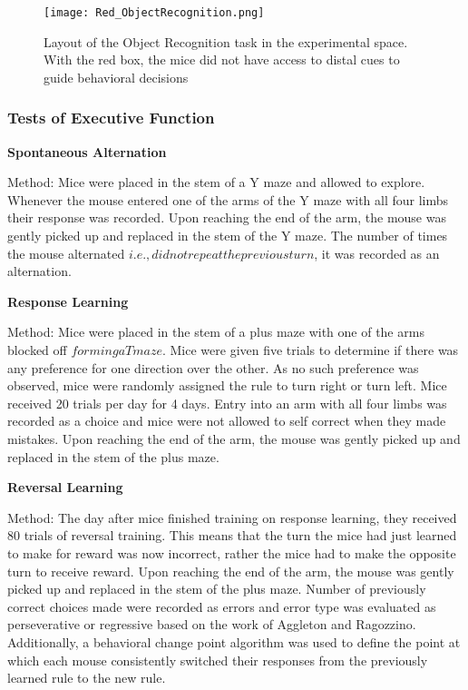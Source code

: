\documentclass{article}
\begin{document}
\begin{figure}[h!]
\centering
\texttt{[image: Red\_ObjectRecognition.png]}
\caption{Layout of the Object Recognition task in the experimental space. With the red box, the mice did not have access to distal cues to guide behavioral decisions}
\label{fig:Ambiguity Control}
\end{figure}

\subsubsection{Tests of Executive Function}
\textbf{Spontaneous Alternation}

Method:
Mice were placed in the stem of a Y maze and allowed to explore. Whenever the mouse entered one of the arms of the Y maze with all four limbs their response was recorded. Upon reaching the end of the arm, the mouse was gently picked up and replaced in the stem of the Y maze. The number of times the mouse alternated \(i.e., did not repeat the previous turn\), it was recorded as an alternation.

\textbf{Response Learning}

Method:
Mice were placed in the stem of a plus maze with one of the arms blocked off \(forming a T maze\). Mice were given five trials to determine if there was any preference for one direction over the other. As no such preference was observed, mice were randomly assigned the rule to turn right or turn left. Mice received 20 trials per day for 4 days. Entry into an arm with all four limbs was recorded as a choice and mice were not allowed to self correct when they made mistakes. Upon reaching the end of the arm, the mouse was gently picked up and replaced in the stem of the plus maze.

\textbf{Reversal Learning}

Method:
The day after mice finished training on response learning, they received 80 trials of reversal training. This means that the turn the mice had just learned to make for reward was now incorrect, rather the mice had to make the opposite turn to receive reward. Upon reaching the end of the arm, the mouse was gently picked up and replaced in the stem of the plus maze. Number of previously correct choices made were recorded as errors and error type was evaluated as perseverative or regressive based on the work of Aggleton and Ragozzino. Additionally, a behavioral change point algorithm was used to define the point at which each mouse consistently switched their responses from the previously learned rule to the new rule.
\end{document}
